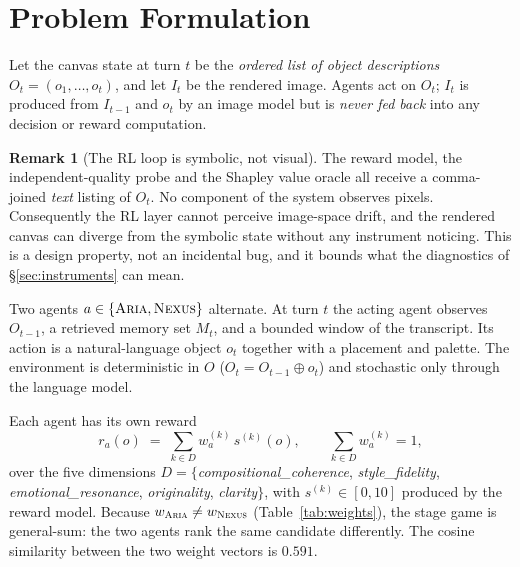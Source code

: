 \documentclass[11pt]{article}
\newcommand{\ARIA}{\textsc{Aria}}
\newcommand{\NEXUS}{\textsc{Nexus}}
\theoremstyle{plain}
\theoremstyle{definition}
\newtheorem{remark}{Remark}
\begin{document}
\section{Problem Formulation}
\label{sec:formulation}
Let the canvas state at turn $t$ be the \emph{ordered list of object
descriptions} $O_t = (o_1,\dots,o_t)$, and let $I_t$ be the rendered image.
Agents act on $O_t$; $I_t$ is produced from $I_{t-1}$ and $o_t$ by an image
model but is \emph{never fed back} into any decision or reward computation.

\begin{remark}[The RL loop is symbolic, not visual]
\label{rem:symbolic}
The reward model, the independent-quality probe and the Shapley value oracle
all receive a comma-joined \emph{text} listing of $O_t$. No component of the
system observes pixels. Consequently the RL layer cannot perceive image-space
drift, and the rendered canvas can diverge from the symbolic state without any
instrument noticing. This is a design property, not an incidental bug, and it
bounds what the diagnostics of \S\ref{sec:instruments} can mean.
\end{remark}

Two agents $a \in \{\ARIA{},\NEXUS{}\}$ alternate. At turn $t$ the acting agent
observes $O_{t-1}$, a retrieved memory set $M_t$, and a bounded window of the
transcript. Its action is a natural-language object $o_t$ together with a
placement and palette. The environment is deterministic in $O$
($O_t = O_{t-1} \oplus o_t$) and stochastic only through the language model.

Each agent has its own reward
\begin{equation}
r_a(o) \;=\; \sum_{k \in D} w_a^{(k)}\, s^{(k)}(o),
\qquad \sum_{k \in D} w_a^{(k)} = 1,
\label{eq:reward}
\end{equation}
over the five dimensions $D = \{$\emph{compositional\_coherence},
\emph{style\_fidelity}, \emph{emotional\_resonance}, \emph{originality},
\emph{clarity}$\}$, with $s^{(k)} \in [0,10]$ produced by the reward model.
Because $w_{\ARIA{}} \neq w_{\NEXUS{}}$ (Table~\ref{tab:weights}), the stage
game is general-sum: the two agents rank the same candidate differently. The
cosine similarity between the two weight vectors is $0.591$.
\end{document}
